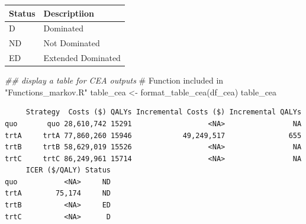 \documentclass[
  letterpaper,
  DIV=11,
  numbers=noendperiod,
  oneside]{scrartcl}
\newenvironment{Shaded}{\begin{snugshade}}{\end{snugshade}}
\newcommand{\AttributeTok}[1]{\textcolor[rgb]{0.40,0.45,0.13}{#1}}
\newcommand{\CommentTok}[1]{\textcolor[rgb]{0.37,0.37,0.37}{#1}}
\newcommand{\DecValTok}[1]{\textcolor[rgb]{0.68,0.00,0.00}{#1}}
\newcommand{\DocumentationTok}[1]{\textcolor[rgb]{0.37,0.37,0.37}{\textit{#1}}}
\newcommand{\FloatTok}[1]{\textcolor[rgb]{0.68,0.00,0.00}{#1}}
\newcommand{\FunctionTok}[1]{\textcolor[rgb]{0.28,0.35,0.67}{#1}}
\newcommand{\NormalTok}[1]{\textcolor[rgb]{0.00,0.23,0.31}{#1}}
\newcommand{\OtherTok}[1]{\textcolor[rgb]{0.00,0.23,0.31}{#1}}
\newcommand{\SpecialCharTok}[1]{\textcolor[rgb]{0.37,0.37,0.37}{#1}}
\newcommand{\StringTok}[1]{\textcolor[rgb]{0.13,0.47,0.30}{#1}}
\begin{document}
\begin{tabular}{l|l}
\hline
Status & Descriptiion\\
\hline
D & Dominated\\
\hline
ND & Not Dominated\\
\hline
ED & Extended Dominated\\
\hline
\end{tabular}

\begin{Shaded}
\begin{Highlighting}[]
\DocumentationTok{\#\# display a table for CEA outputs}
\CommentTok{\# Function included in "Functions\_markov.R"}
\NormalTok{table\_cea }\OtherTok{\textless{}{-}} \FunctionTok{format\_table\_cea}\NormalTok{(df\_cea) }
\NormalTok{table\_cea}
\end{Highlighting}
\end{Shaded}

\begin{verbatim}
     Strategy  Costs ($) QALYs Incremental Costs ($) Incremental QALYs
quo       quo 28,610,742 15291                  <NA>                NA
trtA     trtA 77,860,260 15946            49,249,517               655
trtB     trtB 58,629,019 15526                  <NA>                NA
trtC     trtC 86,249,961 15714                  <NA>                NA
     ICER ($/QALY) Status
quo           <NA>     ND
trtA        75,174     ND
trtB          <NA>     ED
trtC          <NA>      D
\end{verbatim}

\begin{Shaded}
\end{Shaded}
\end{document}
